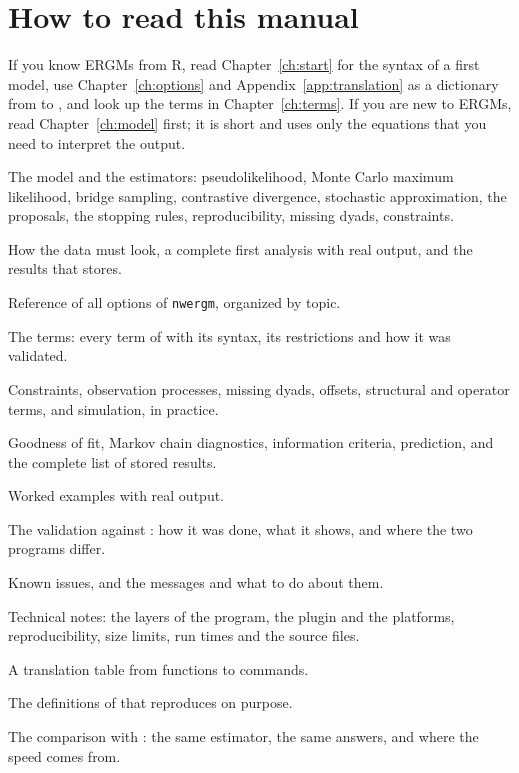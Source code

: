 \section{How to read this manual}

If you know ERGMs from R, read Chapter~\ref{ch:start} for the syntax of a first model, use Chapter~\ref{ch:options} and Appendix~\ref{app:translation} as a dictionary from \ergm{} to \nwergm{}, and look up the terms in Chapter~\ref{ch:terms}. If you are new to ERGMs, read Chapter~\ref{ch:model} first; it is short and uses only the equations that you need to interpret the output.

\begin{description}[style=nextline,nosep]
  \item[Chapter~\ref{ch:model}] The model and the estimators: pseudolikelihood, Monte Carlo maximum likelihood, bridge sampling, contrastive divergence, stochastic approximation, the proposals, the stopping rules, reproducibility, missing dyads, constraints.
  \item[Chapter~\ref{ch:start}] How the data must look, a complete first analysis with real output, and the results that \nwergm{} stores.
  \item[Chapter~\ref{ch:options}] Reference of all options of \texttt{nwergm}, organized by topic.
  \item[Chapter~\ref{ch:terms}] The terms: every term of \ergm{} with its \nwergm{} syntax, its restrictions and how it was validated.
  \item[Chapter~\ref{ch:special}] Constraints, observation processes, missing dyads, offsets, structural and operator terms, and simulation, in practice.
  \item[Chapter~\ref{ch:postest}] Goodness of fit, Markov chain diagnostics, information criteria, prediction, and the complete list of stored results.
  \item[Chapter~\ref{ch:examples}] Worked examples with real output.
  \item[Chapter~\ref{ch:validation}] The validation against \ergm{}: how it was done, what it shows, and where the two programs differ.
  \item[Chapter~\ref{ch:limits}] Known issues, and the messages and what to do about them.
  \item[Chapter~\ref{ch:technical}] Technical notes: the layers of the program, the plugin and the platforms, reproducibility, size limits, run times and the source files.
  \item[Appendix~\ref{app:translation}] A translation table from \ergm{} functions to \nwergm{} commands.
  \item[Appendix~\ref{app:quirks}] The definitions of \ergm{} that \nwergm{} reproduces on purpose.
  \item[Appendix~\ref{app:samest}] The comparison with \ergm{}: the same estimator, the same answers, and where the speed comes from.
\end{description}

